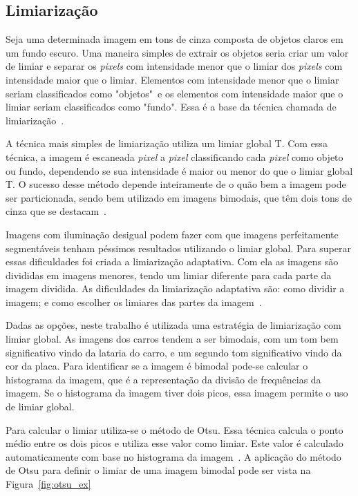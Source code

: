 \subsection{Limiarização}
\label{sec:limiarizacao}

Seja uma determinada imagem em tons de cinza composta de objetos claros em um fundo escuro. Uma maneira simples de extrair os objetos seria criar um valor de limiar e separar os \emph{pixels} com intensidade menor que o limiar dos \emph{pixels} com intensidade maior que o limiar. Elementos com intensidade menor que o limiar seriam classificados como "objetos"~e os elementos com intensidade maior que o limiar seriam classificados como "fundo". Essa é a base da técnica chamada de limiarização~\cite{gonzalez1977digital}.

A técnica mais simples de limiarização utiliza um limiar global T. Com essa técnica, a imagem é escaneada \emph{pixel} a \emph{pixel} classificando cada \emph{pixel} como objeto ou fundo, dependendo se sua intensidade é maior ou menor do que o limiar global T. O sucesso desse método depende inteiramente de o quão bem a imagem pode ser particionada, sendo bem utilizado em imagens bimodais, que têm dois tons de cinza que se destacam~\cite{gonzalez1977digital}.

Imagens com iluminação desigual podem fazer com que imagens perfeitamente segmentáveis tenham péssimos resultados utilizando o limiar global. Para superar essas dificuldades foi criada a limiarização adaptativa. Com ela as imagens são divididas em imagens menores, tendo um limiar diferente para cada parte da imagem dividida. As dificuldades da limiarização adaptativa são: como dividir a imagem; e como escolher os limiares das partes da imagem~\cite{gonzalez1977digital}.

Dadas as opções, neste trabalho é utilizada uma estratégia de limiarização com limiar global. As imagens dos carros tendem a ser bimodais, com um tom bem significativo vindo da lataria do carro, e um segundo tom significativo vindo da cor da placa. Para identificar se a imagem é bimodal pode-se calcular o histograma da imagem, que é a representação da divisão de frequências da imagem. Se o histograma da imagem tiver dois picos, essa imagem permite o uso de limiar global.

Para calcular o limiar utiliza-se o método de Otsu. Essa técnica calcula o ponto médio entre os dois picos e utiliza esse valor como limiar. Este valor é calculado automaticamente com base no histograma da imagem~\cite{opencv2014thresh}. A aplicação do método de Otsu para definir o limiar de uma imagem bimodal pode ser vista na Figura~\ref{fig:otsu_ex}

